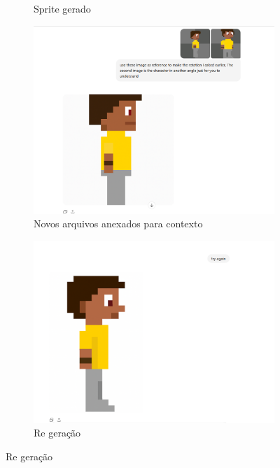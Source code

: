 \begin{figure}[htbp]
\begin{subfigure}{0.2\linewidth}
        \caption{\small Sprite gerado}
        \label{fig:chatGPT2b}
    \end{subfigure}
        \begin{subfigure}{0.65\linewidth}
        \includegraphics[width=1\linewidth]{figs/chatGPT/visao_lateral/tela2.PNG}
        \caption{\small Novos arquivos anexados para contexto}
        \label{fig:chatGPT2c}
    \end{subfigure}
    \begin{subfigure}{0.55\linewidth}
        \includegraphics[width=1\linewidth]{figs/chatGPT/visao_lateral/tela 2.5.PNG}
        \caption{\small Re geração}
        \label{fig:chatGPT2d}
    \end{subfigure}
\end{figure}


